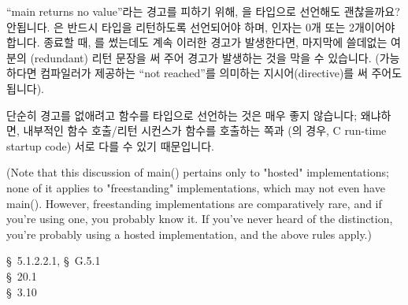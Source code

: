 \begin{faq}
	``main returns no value''라는 경고를 피하기 위해,
	을  타입으로 선언해도 괜찮을까요?
\A
	안됩니다.  은 반드시  타입을 리턴하도록
	선언되어야 하며, 인자는 0개 또는 2개이어야 합니다.
	종료할 때, 를 썼는데도 계속 이러한 경고가 발생한다면,
	마지막에 쓸데없는 여분의 (redundant) 리턴 문장을 써 주어
	경고가 발생하는 것을 막을 수 있습니다.  (가능하다면 컴파일러가
	제공하는 ``not reached''를 의미하는 지시어(directive)를 써
	주어도 됩니다).

	단순히 경고를 없애려고 함수를  타입으로 선언하는 것은 
	매우 좋지 않습니다; 왜냐하면, 내부적인 함수 호출/리턴 시컨스가
	함수를 호출하는 쪽과 (의 경우, C run-time startup code)
	서로 다를 수 있기 때문입니다.  

	(Note that this discussion of main() pertains only to "hosted"
	implementations; none of it applies to "freestanding"
	implementations, which may not even have main().   However,
	freestanding implementations are comparatively rare, and if
	you're using one, you probably know it.   If you've never heard
	of the distinction, you're probably using a hosted
	implementation, and the above rules apply.)

\R	\cite{c89} \S\ 5.1.2.2.1, \S\ G.5.1 \\
	\cite{hs} \S\ 20.1  \\
	\cite{ctp} \S\ 3.10 
\end{faq}

